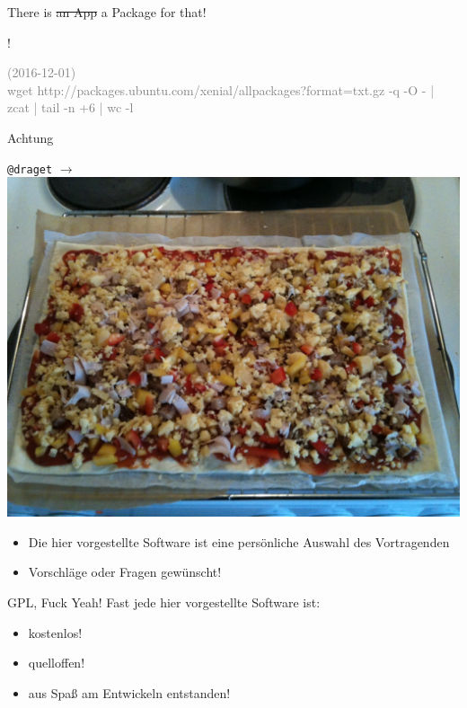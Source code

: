\begin{frame}{There is \st{an App} a Package for that!}

\begin{center}
{\fontsize{100}{90}!}
\end{center}
\vfill

\textcolor{gray}{\tiny (2016-12-01) \\ wget http://packages.ubuntu.com/xenial/allpackages?format=txt.gz -q -O - | zcat | tail -n +6 | wc -l}
\end{frame}


\begin{frame}{Achtung}
\begin{center}
\texttt{@draget} $ \rightarrow $ \includegraphics[scale=0.12]{images/draget}
\end{center}
\begin{itemize}
\item Die hier vorgestellte Software ist eine persönliche Auswahl des Vortragenden
\item Vorschläge oder Fragen gewünscht!
\end{itemize}
\end{frame}

\begin{frame}{GPL, Fuck Yeah!}
Fast jede hier vorgestellte Software ist:
\begin{itemize}
\item kostenlos!
\item quelloffen!
\item aus Spaß am Entwickeln entstanden!
\end{itemize}
\end{frame}
